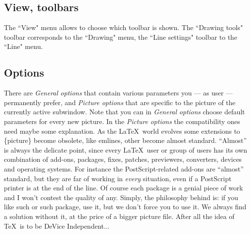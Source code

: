 \documentclass[11pt,a4paper]{article}
\begin{document}
\subsection{View, toolbars}
The ``View" menu allows to choose which toolbar is shown.
The ``Drawing tools" toolbar corresponds to the ``Drawing" menu,
the ``Line settings" toolbar to the ``Line" menu.
%
\subsection{Options}
%
There are {\sl General options} that contain various parameters you
--- as user --- permanently prefer, and {\sl Picture options} that
are specific to the picture of the currently active subwindow.
Note that you can in {\sl General options} choose default parameters
for every new picture.
In the {\sl Picture options} the compatibility ones need maybe
some explanation. As the \LaTeX\, world evolves some extensions
to \{picture\} become obsolete, like emlines, other become almost
standard. ``Almost'' is always the delicate point, since every
\LaTeX\, user or group of users has its own combination of
add-ons, packages, fixes, patches, previewers, converters, devices
and operating systems. For instance the PostScript-related
add-ons are ``almost'' standard, but they are far of working
in {\em every} situation, even if a PostScript printer is at the
end of the line. Of course each package is a genial piece of work
and I won't contest the quality of any. Simply, the philosophy
behind {\TC} is: if you like such or such package, use it, but
we don't force you to use it. We always find a solution without it,
at the price of a bigger picture file. After all the idea of
\TeX\, is to be DeVice Independent...
%
%
\end{document}
